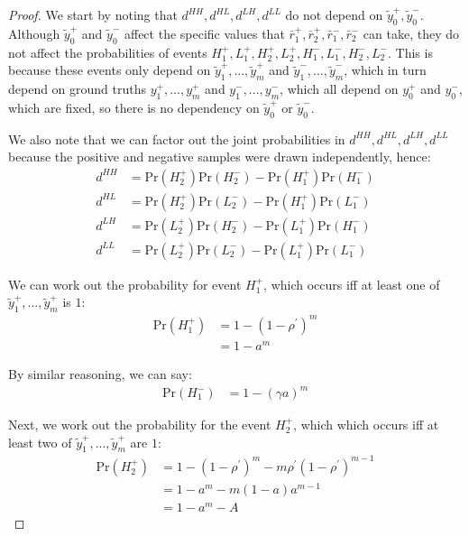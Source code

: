 \begin{proof}
We start by noting that $d^{HH}, d^{HL}, d^{LH}, d^{LL}$ do not depend on $\tilde{y}_0^{+}, \tilde{y}_0^{-}$. Although $\tilde{y}_0^{+}$ and $\tilde{y}_0^{-}$ affect the specific values that $\bar{r}_1^{+}, \bar{r}_2^{+}, \bar{r}_1^{-}, \bar{r}_2^{-}$ can take, they do not affect the probabilities of events $H_1^{+}, L_1^{+}, H_2^{+}, L_2^{+}, H_1^{-}, L_1^{-}, H_2^{-}, L_2^{-}$. This is because these events only depend on $\tilde{y}_1^{+},...,\tilde{y}_m^{+}$ and $\tilde{y}_1^{-},...,\tilde{y}_m^{-}$, which in turn depend on ground truths $y_1^{+},...,y_m^{+}$ and $y_1^{-},...,y_m^{-}$, which all depend on $y_0^{+}$ and $y_0^{-}$, which are fixed, so there is no dependency on $\tilde{y}_0^{+}$ or $\tilde{y}_0^{-}$.

We also note that we can factor out the joint probabilities in $d^{HH}, d^{HL}, d^{LH}, d^{LL}$ because the positive and negative samples were drawn independently, hence:
\begin{align}
d^{HH} &= \textrm{Pr}(H_2^{+}) \textrm{Pr}(H_2^{-}) - \textrm{Pr}(H_1^{+}) \textrm{Pr}(H_1^{-})\\
d^{HL} &= \textrm{Pr}(H_2^{+}) \textrm{Pr}(L_2^{-}) - \textrm{Pr}(H_1^{+}) \textrm{Pr}(L_1^{-})\\
d^{LH} &= \textrm{Pr}(L_2^{+}) \textrm{Pr}(H_2^{-}) - \textrm{Pr}(L_1^{+}) \textrm{Pr}(H_1^{-})\\
d^{LL} &= \textrm{Pr}(L_2^{+}) \textrm{Pr}(L_2^{-}) - \textrm{Pr}(L_1^{+}) \textrm{Pr}(L_1^{-})
\end{align}

We can work out the probability for event $H_1^{+}$, which occurs iff at least one of $\tilde{y}_1^{+},...,\tilde{y}_m^{+}$ is $1$:
\begin{align}
\textrm{Pr}(H_1^{+}) &= 1 - (1 - \rho^{\prime})^m\\
&= 1 - a^m
\end{align}

By similar reasoning, we can say:
\begin{align}
\textrm{Pr}(H_1^{-}) &= 1 - (\gamma a)^m
\end{align}

Next, we work out the probability for the event $H_2^{+}$, which which occurs iff at least two of $\tilde{y}_1^{+},...,\tilde{y}_m^{+}$ are $1$:
\begin{align}
\textrm{Pr}(H_2^{+}) &= 1 - (1 - \rho^{\prime})^m - m \rho^{\prime} (1 - \rho^{\prime})^{m-1}\\
&= 1 - a^m - m (1 - a)a^{m-1}\\
&= 1 - a^m - A
\end{align}


\end{proof}
